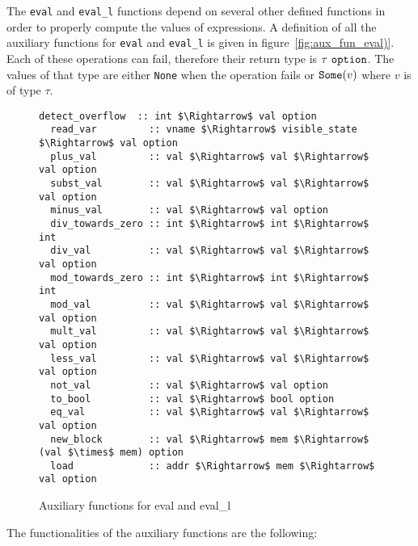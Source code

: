 The \verb|eval| and \verb|eval_l| functions depend on several other defined functions in order to properly compute the values of expressions.
A definition of all the auxiliary functions for \verb|eval| and \verb|eval_l| is given in figure~\ref{fig:aux_fun_eval)}.
Each of these operations can fail, therefore their return type is $\tau\ \verb|option|$.
The values of that type are either \verb|None| when the operation fails or $\verb|Some|(v)$ where $v$ is of type $\tau$.

\begin{figure}
  \caption{Auxiliary functions for eval and eval_l}
  \label{fig:aux_fun_eval}

  \begin{lstlisting}[mathescape=true, frame=single]
  detect_overflow  :: int $\Rightarrow$ val option
  read_var         :: vname $\Rightarrow$ visible_state $\Rightarrow$ val option
  plus_val         :: val $\Rightarrow$ val $\Rightarrow$ val option
  subst_val        :: val $\Rightarrow$ val $\Rightarrow$ val option
  minus_val        :: val $\Rightarrow$ val option
  div_towards_zero :: int $\Rightarrow$ int $\Rightarrow$ int
  div_val          :: val $\Rightarrow$ val $\Rightarrow$ val option
  mod_towards_zero :: int $\Rightarrow$ int $\Rightarrow$ int
  mod_val          :: val $\Rightarrow$ val $\Rightarrow$ val option
  mult_val         :: val $\Rightarrow$ val $\Rightarrow$ val option
  less_val         :: val $\Rightarrow$ val $\Rightarrow$ val option
  not_val          :: val $\Rightarrow$ val option
  to_bool          :: val $\Rightarrow$ bool option
  eq_val           :: val $\Rightarrow$ val $\Rightarrow$ val option
  new_block        :: val $\Rightarrow$ mem $\Rightarrow$ (val $\times$ mem) option
  load             :: addr $\Rightarrow$ mem $\Rightarrow$ val option
  \end{lstlisting}
\end{figure}

The functionalities of the auxiliary functions are the following:

